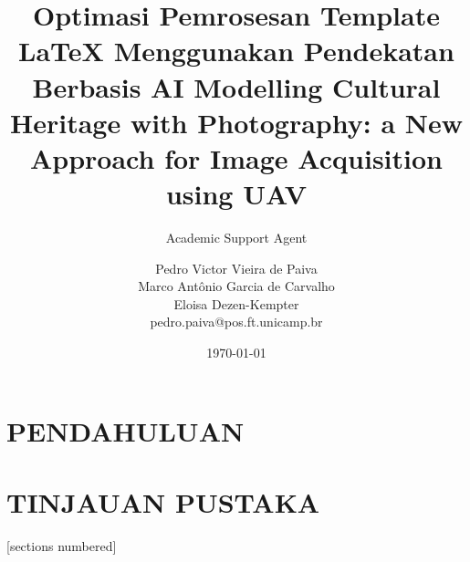 \documentclass{beamer}
\title{Optimasi Pemrosesan Template LaTeX Menggunakan Pendekatan Berbasis AI}
\author{Academic Support Agent}
\date{\today}
\begin{document}
\maketitle

\begin{abstract}

\end{abstract}

\chapter{PENDAHULUAN}


\chapter{TINJAUAN PUSTAKA}


\usepackage[T1]{fontenc}
\usepackage{multicol}
\usepackage{ragged2e}   %
\usepackage[utf8]{inputenc}
\usepackage[brazil]{varioref}
\usepackage[square,sort,comma,super,authoryear]{natbib}
\usepackage{xmpmulti}
\usepackage{epsfig}
\usepackage{subcaption}
\captionsetup{compatibility=false}
\usepackage{ru,graphicx,hyperref,url} %

[sections numbered]


\title[Modelling Cultural Heritage with Photography]{
 Modelling Cultural Heritage with Photography: a New Approach for Image Acquisition using UAV}


\author[Pedro Victor Vieira de Paiva]{
  Pedro Victor Vieira de Paiva\\
  Marco Antônio Garcia de Carvalho\\
  Eloisa Dezen-Kempter\\\medskip
  {\small {pedro.paiva@pos.ft.unicamp.br}
  }}
\end{document}
